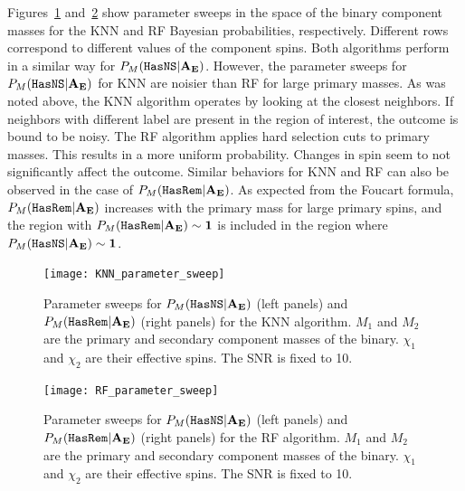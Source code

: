 Figures~\ref{fig:param_sweep_KNN} and~\ref{fig:param_sweep_RF} show parameter sweeps in the space of the binary component masses for the \ac{KNN} and \ac{RF} Bayesian probabilities,
respectively. Different rows correspond to different values of the component spins. Both algorithms perform in a similar way for $P_M({{\tt HasNS}} |\bf{A_E})$. However, the parameter sweeps for
$P_M({{\tt HasNS}} |\bf{A_E})$ for \ac{KNN} are noisier than \ac{RF} for large primary masses. As was noted above, the \ac{KNN} algorithm operates by looking at the closest neighbors. If neighbors with
different label are present in the region of interest, the outcome is bound to be noisy. The \ac{RF} algorithm applies hard selection cuts to primary masses. This results in a more uniform
probability. Changes in spin seem to not significantly affect the outcome.  Similar behaviors for \ac{KNN} and \ac{RF} can also be observed in the case of $P_M({{\tt HasRem}} |\bf{A_E})$. As expected
from the Foucart formula, $P_M({{\tt HasRem}} |\bf{A_E})$ increases with the primary mass for large primary spins, and the region with $P_M({{\tt HasRem}} |\bf{A_E}) \sim 1$ is included in the region where
$P_M({{\tt HasNS}} |\bf{A_E}) \sim 1$.

\begin{figure}%
\texttt{[image: KNN\_parameter\_sweep]}
    \caption{Parameter sweeps for $P_M({{\tt HasNS}} |\bf{A_E})$ (left panels) and $P_M({{\tt HasRem}} |\bf{A_E})$ (right panels) for the \ac{KNN} algorithm. $M_1$ and $M_2$ are the primary and secondary component masses of the binary. $\chi_1$ and $\chi_2$ are their effective spins. The \ac{SNR} is fixed to 10.}
\label{fig:param_sweep_KNN}
\end{figure}

\begin{figure}%
\texttt{[image: RF\_parameter\_sweep]}
    \caption{Parameter sweeps for $P_M({{\tt HasNS}} |\bf{A_E})$ (left panels) and $P_M({{\tt HasRem}} |\bf{A_E})$ (right panels) for the \ac{RF} algorithm. $M_1$ and $M_2$ are the primary and secondary component masses of the binary. $\chi_1$ and $\chi_2$ are their effective spins. The \ac{SNR} is fixed to 10.}
\label{fig:param_sweep_RF}
\end{figure}



%




